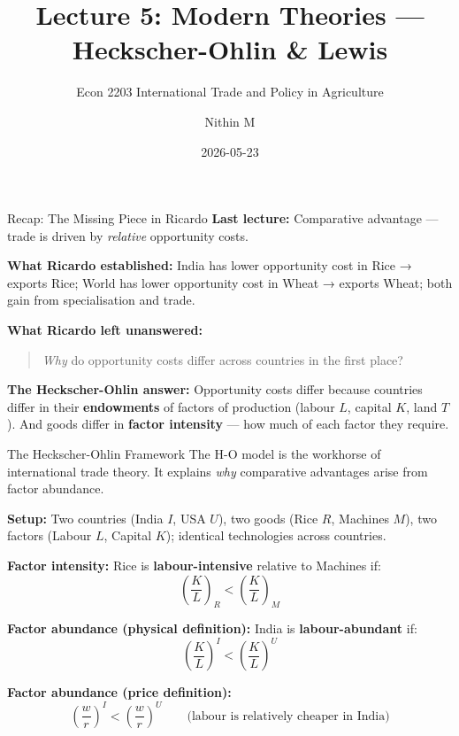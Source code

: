 \documentclass[
  ignorenonframetext,
  aspectratio=169,
]{beamer}
\title[L5 \textbar{} Heckscher-Ohlin \& Lewis]{Lecture 5: Modern
Theories --- Heckscher-Ohlin \& Lewis}
\subtitle{Econ 2203 \textbar{} International Trade and Policy in
Agriculture}
\author{Nithin M}
\date{2026-05-23}
\institute{Department of Development Economics}
\makeatletter
\let\quarto@originallabel\label
\DeclareRobustCommand*{\label}[1]{\quarto@originallabel{#1}}
\makeatother
\begin{document}
\frame{\titlepage}


\begin{frame}{Recap: The Missing Piece in Ricardo}
\label{recap-the-missing-piece-in-ricardo}
\textbf{Last lecture:} Comparative advantage --- trade is driven by
\emph{relative} opportunity costs.

\textbf{What Ricardo established:} India has lower opportunity cost in
Rice → exports Rice; World has lower opportunity cost in Wheat → exports
Wheat; both gain from specialisation and trade.

\textbf{What Ricardo left unanswered:}

\begin{quote}
\emph{Why} do opportunity costs differ across countries in the first
place?
\end{quote}

\textbf{The Heckscher-Ohlin answer:} Opportunity costs differ because
countries differ in their \textbf{endowments} of factors of production
(labour \(L\), capital \(K\), land \(T\)). And goods differ in
\textbf{factor intensity} --- how much of each factor they require.
\end{frame}

\begin{frame}{The Heckscher-Ohlin Framework}
\label{the-heckscher-ohlin-framework}
The H-O model is the workhorse of international trade theory. It
explains \emph{why} comparative advantages arise from factor abundance.

\textbf{Setup:} Two countries (India \(I\), USA \(U\)), two goods (Rice
\(R\), Machines \(M\)), two factors (Labour \(L\), Capital \(K\));
identical technologies across countries.

\textbf{Factor intensity:} Rice is \textbf{labour-intensive} relative to
Machines if: \[\left(\frac{K}{L}\right)_R < \left(\frac{K}{L}\right)_M\]

\textbf{Factor abundance (physical definition):} India is
\textbf{labour-abundant} if:
\[\left(\frac{K}{L}\right)^I < \left(\frac{K}{L}\right)^U\]

\textbf{Factor abundance (price definition):}
\[\left(\frac{w}{r}\right)^I < \left(\frac{w}{r}\right)^U \qquad \text{(labour is relatively cheaper in India)}\]
\end{frame}
\end{document}
